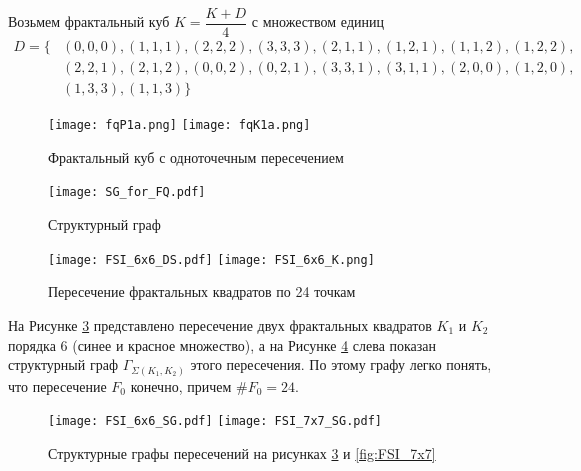 \begin{example}
Возьмем фрактальный куб $K=\dfrac{K+D}{4}$ с множеством единиц 
\begin{equation*}
\begin{split}
D=\{
    &(0,0,0), (1,1,1), (2,2,2), (3,3,3), (2,1,1), (1,2,1), (1,1,2), (1,2,2),\\ 
    &(2,2,1), (2,1,2), (0,0,2), (0,2,1), (3,3,1), (3,1,1), (2,0,0), (1,2,0),\\ 
    &(1,3,3), (1,1,3)\}     
\end{split}
\end{equation*}
 
\begin{figure}[H]
    \centering
    \texttt{[image: fqP1a.png]}
    \hfill
    \texttt{[image: fqK1a.png]}
    \caption{Фрактальный куб с одноточечным пересечением}
    \label{fig:fq}
\end{figure}

\begin{figure}[H]
    \centering
    \texttt{[image: SG\_for\_FQ.pdf]}
    \caption{Структурный граф}
    \label{fig:fq_sg}
\end{figure}
\end{example}

\begin{figure}[H]
    \centering
    \hfill
    \texttt{[image: FSI\_6x6\_DS.pdf]}
    \hfill
    \texttt{[image: FSI\_6x6\_K.png]}
    \hfill
    \caption{Пересечение фрактальных квадратов по 24 точкам}
    \label{fig:FSI_6x6}
\end{figure}

\begin{example}
\label{ex:FSI_6x6}
На Рисунке \ref{fig:FSI_6x6} представлено пересечение двух фрактальных квадратов $K_1$ и $K_2$ порядка $6$ (синее и красное множество), а на Рисунке \ref{fig:FSI_SG} слева показан структурный граф $\Gamma_{\Sigma(K_1,K_2)}$ этого пересечения.
По этому графу легко понять, что пересечение $F_0$ конечно, причем $\#F_0=24.$
\end{example}

\begin{figure}[H]
    \centering
    \hfill
    \texttt{[image: FSI\_6x6\_SG.pdf]}
    \hfill
    \texttt{[image: FSI\_7x7\_SG.pdf]}
    \hfill
    \caption{Структурные графы пересечений на рисунках \ref{fig:FSI_6x6} и \ref{fig:FSI_7x7}}
    \label{fig:FSI_SG}
\end{figure}

